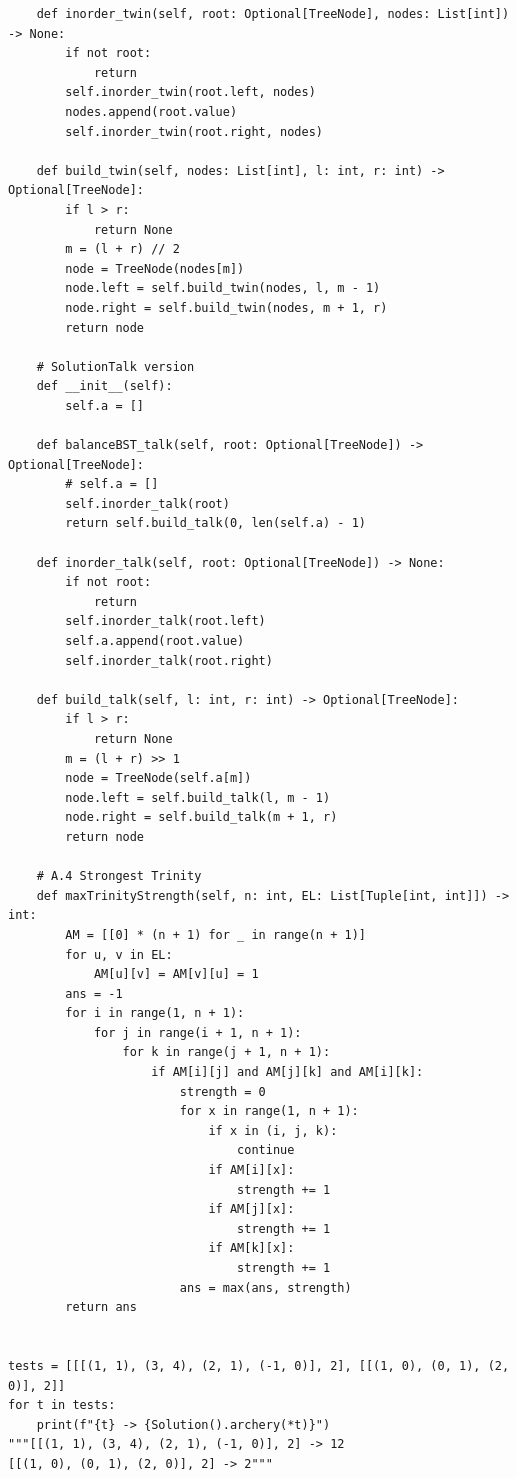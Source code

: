 \documentclass[12pt]{article}
\begin{document}
\begin{verbatim}
    def inorder_twin(self, root: Optional[TreeNode], nodes: List[int]) -> None:
        if not root:
            return
        self.inorder_twin(root.left, nodes)
        nodes.append(root.value)
        self.inorder_twin(root.right, nodes)

    def build_twin(self, nodes: List[int], l: int, r: int) -> Optional[TreeNode]:
        if l > r:
            return None
        m = (l + r) // 2
        node = TreeNode(nodes[m])
        node.left = self.build_twin(nodes, l, m - 1)
        node.right = self.build_twin(nodes, m + 1, r)
        return node

    # SolutionTalk version
    def __init__(self):
        self.a = []

    def balanceBST_talk(self, root: Optional[TreeNode]) -> Optional[TreeNode]:
        # self.a = []
        self.inorder_talk(root)
        return self.build_talk(0, len(self.a) - 1)

    def inorder_talk(self, root: Optional[TreeNode]) -> None:
        if not root:
            return
        self.inorder_talk(root.left)
        self.a.append(root.value)
        self.inorder_talk(root.right)

    def build_talk(self, l: int, r: int) -> Optional[TreeNode]:
        if l > r:
            return None
        m = (l + r) >> 1
        node = TreeNode(self.a[m])
        node.left = self.build_talk(l, m - 1)
        node.right = self.build_talk(m + 1, r)
        return node

    # A.4 Strongest Trinity
    def maxTrinityStrength(self, n: int, EL: List[Tuple[int, int]]) -> int:
        AM = [[0] * (n + 1) for _ in range(n + 1)]
        for u, v in EL:
            AM[u][v] = AM[v][u] = 1
        ans = -1
        for i in range(1, n + 1):
            for j in range(i + 1, n + 1):
                for k in range(j + 1, n + 1):
                    if AM[i][j] and AM[j][k] and AM[i][k]:
                        strength = 0
                        for x in range(1, n + 1):
                            if x in (i, j, k):
                                continue
                            if AM[i][x]:
                                strength += 1
                            if AM[j][x]:
                                strength += 1
                            if AM[k][x]:
                                strength += 1
                        ans = max(ans, strength)
        return ans


tests = [[[(1, 1), (3, 4), (2, 1), (-1, 0)], 2], [[(1, 0), (0, 1), (2, 0)], 2]]
for t in tests:
    print(f"{t} -> {Solution().archery(*t)}")
"""[[(1, 1), (3, 4), (2, 1), (-1, 0)], 2] -> 12
[[(1, 0), (0, 1), (2, 0)], 2] -> 2"""


\end{verbatim}
\end{document}

